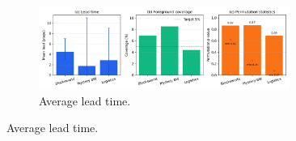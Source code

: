 \documentclass[11pt]{article}
\begin{document}
\begin{figure}[h]
  \centering
  \begin{subfigure}[t]{0.9\textwidth}
    \centering
    \includegraphics[width=0.9\textwidth]{figures/planbench_lead.png}
    \caption{Average lead time.}
  \end{subfigure}

  \vspace{0.8em}


\end{figure}
\end{document}
